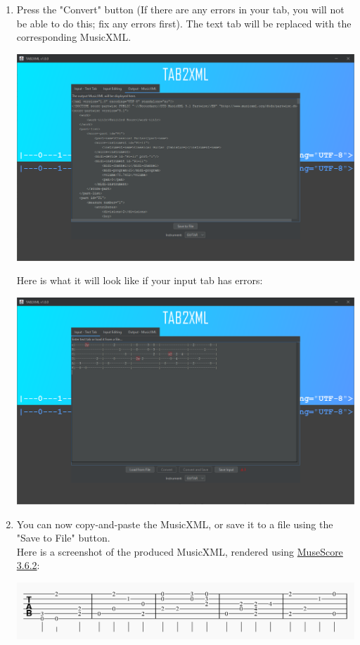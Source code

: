 \documentclass[11pt]{article}
\begin{document}
\begin{enumerate}
\begin{center}
\end{center}
\item Press the "Convert" button (If there are any errors in your tab, you will not be able to do this; fix any errors first).  The text tab will be replaced with the corresponding MusicXML.
\begin{center}
\includegraphics[width=.9\linewidth]{../Screenshots/converted-20210413-tabbedview.png}
\end{center}
Here is what it will look like if your input tab has errors:
\begin{center}
\includegraphics[width=.9\linewidth]{../Screenshots/sample-invalid-input-tabbedview.png}
\end{center}
\item You can now copy-and-paste the MusicXML, or save it to a file using the "Save to File" button. \\
Here is a screenshot of the produced MusicXML, rendered using \href{https://musescore.org/en/download}{MuseScore 3.6.2}:
\begin{center}
\includegraphics[width=.9\linewidth]{../Screenshots/converted-20210413-musescore.png}
\end{center}
\end{enumerate}
\end{document}
